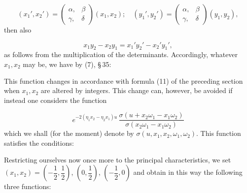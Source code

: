 \[
(x_1', x_2') = \begin{pmatrix}\alpha, & \beta\\ \gamma, & \delta\end{pmatrix}(x_1, x_2); \quad (y_1', y_2') = \begin{pmatrix}\alpha, & \beta\\ \gamma, & \delta\end{pmatrix}(y_1, y_2),
\]
then also

\[
x_1 y_2 - x_2 y_1 = x_1' y_2' - x_2' y_1',
\]
as follows from the multiplication of the determinants. Accordingly, whatever $x_1, x_2$ may be, we have by (7), \S\,35:

This function changes in accordance with formula (11) of the preceding section when $x_1, x_2$ are altered by integers. This change can, however, be avoided if instead one considers the function

\[
e^{-2(\eta_1 x_2 - \eta_2 x_1)u}\, \frac{\sigma(u + x_2\omega_1 - x_1\omega_2)}{\sigma(x_2\omega_1 - x_1\omega_2)}
\]
which we shall (for the moment) denote by $\sigma(u, x_1, x_2, \omega_1, \omega_2)$. This function satisfies the conditions:




Restricting ourselves now once more to the principal characteristics, we set $(x_1, x_2) = \left(-\dfrac{1}{2}, \dfrac{1}{2}\right)$, $\left(0, \dfrac{1}{2}\right)$, $\left(-\dfrac{1}{2}, 0\right)$ and obtain in this way the following three functions:

